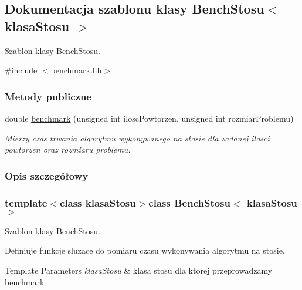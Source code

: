 \hypertarget{class_bench_stosu}{\subsection{Dokumentacja szablonu klasy Bench\-Stosu$<$ klasa\-Stosu $>$}
\label{class_bench_stosu}
}


Szablon klasy \hyperlink{class_bench_stosu}{Bench\-Stosu}.  




{\ttfamily \#include $<$benchmark.\-hh$>$}

\subsubsection*{Metody publiczne}
\begin{DoxyCompactItemize}
\item 
double \hyperlink{class_bench_stosu_a980f90b8aeb81c89e96acaf891a071c3}{benchmark} (unsigned int ilosc\-Powtorzen, unsigned int rozmiar\-Problemu)
\begin{DoxyCompactList}\small\item\em Mierzy czas trwania algorytmu wykonywanego na stosie dla zadanej ilosci powtorzen oraz rozmiaru problemu. \end{DoxyCompactList}\end{DoxyCompactItemize}


\subsubsection{Opis szczegółowy}
\subsubsection*{template$<$class klasa\-Stosu$>$class Bench\-Stosu$<$ klasa\-Stosu $>$}

Szablon klasy \hyperlink{class_bench_stosu}{Bench\-Stosu}. 

Definiuje funkcje sluzace do pomiaru czasu wykonywania algorytmu na stosie. 
\begin{DoxyTemplParams}{Template Parameters}
{\em klasa\-Stosu} & klasa stosu dla ktorej przeprowadzamy benchmark \\
\hline
\end{DoxyTemplParams}


